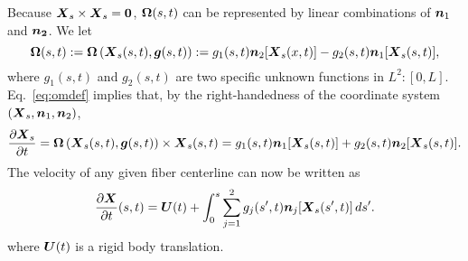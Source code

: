 Because $\boldsymbol{X}_s \times \boldsymbol{X}_s=\boldsymbol{0}$, $\boldsymbol{\Omega}(s,t)$ can be represented by linear combinations of $\boldsymbol{n}_1$ and $\boldsymbol{n_2}$. We let 
\begin{equation}
\label{eq:omdef}
\boldsymbol{\Omega}(s,t) := \boldsymbol{\Omega}\left(\boldsymbol{X}_s(s,t),\boldsymbol{g}(s,t)\right) := g_1(s,t)\boldsymbol{n}_2[\boldsymbol{X}_s(x,t)]-g_2(s,t)\boldsymbol{n}_1[\boldsymbol{X}_s(s,t)],  
\end{equation}
where $g_1(s,t)$ and $g_2(s,t)$ are two specific unknown functions in $L^2:[0,L]$. Eq.\ \eqref{eq:omdef} implies that, by the right-handedness of the coordinate system $(\boldsymbol{X}_s, \boldsymbol{n}_1, \boldsymbol{n}_2)$, 
\begin{equation}
\label{eq:Xsupdate}
\frac{\partial \boldsymbol{X}_s}{\partial t} = \boldsymbol{\Omega}\left(\boldsymbol{X}_s(s,t),\boldsymbol{g}(s,t)\right) \times \boldsymbol{X}_s(s,t) = g_1(s,t)\boldsymbol{n}_1[\boldsymbol{X}_s(s,t)] + g_2(s,t)\boldsymbol{n}_2[\boldsymbol{X}_s(s,t)]. 
\end{equation}
The velocity of any given fiber centerline can now be written as 
\begin{equation}
\label{eq:velfib}
\frac{\partial \boldsymbol{X}}{\partial t}(s,t) = \boldsymbol{U}(t)+\int_0^s  \sum_{j=1}^2 g_j(s',t)\boldsymbol{n}_j[\boldsymbol{X}_s(s',t)] \,ds' . 
\end{equation}
where $\boldsymbol{U}(t)$ is a rigid body translation. 


